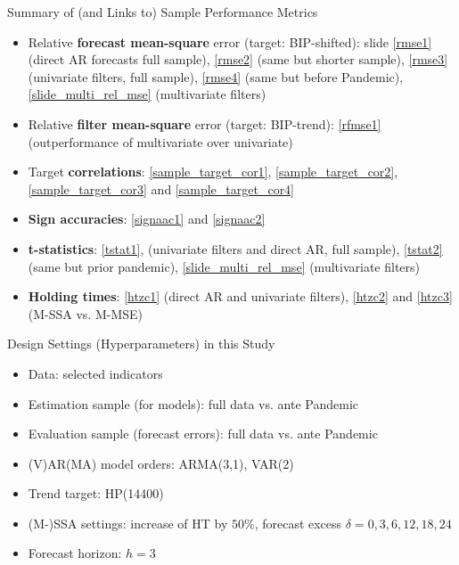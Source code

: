 \documentclass{beamer}
\begin{document}
\begin{frame} {Summary of (and Links to) Sample Performance Metrics}
\begin{itemize}
\item Relative \textbf{forecast mean-square} error (target: BIP-shifted): slide \eqref{rmse1} (direct AR forecasts full sample), \eqref{rmse2} (same but shorter sample), \eqref{rmse3} (univariate filters, full sample), \eqref{rmse4} (same but before Pandemic), \eqref{slide_multi_rel_mse} (multivariate filters) 

\item Relative \textbf{filter mean-square} error (target: BIP-trend): \eqref{rfmse1} (outperformance of multivariate over univariate)

\item Target \textbf{correlations}: \eqref{sample_target_cor1}, \eqref{sample_target_cor2}, \eqref{sample_target_cor3} and \eqref{sample_target_cor4} 

\item \textbf{Sign accuracies}: \eqref{signaac1} and \eqref{signaac2}

\item \textbf{t-statistics}: \eqref{tstat1},  (univariate filters and direct AR, full sample), \eqref{tstat2} (same but prior pandemic), \eqref{slide_multi_rel_mse} (multivariate filters)

\item \textbf{Holding times}: \eqref{htzc1} (direct AR and univariate filters), \eqref{htzc2} and \eqref{htzc3} (M-SSA vs. M-MSE)
\end{itemize}
\end{frame}



\begin{frame} {Design Settings (Hyperparameters) in this Study}
\begin{itemize}
\item Data: selected indicators
\item Estimation sample (for models): full data vs. ante Pandemic
\item Evaluation sample (forecast errors): full data vs. ante Pandemic
\item (V)AR(MA) model orders: ARMA(3,1), VAR(2)
\item Trend target: HP(14400)
\item (M-)SSA settings: increase of HT by $50\%$, forecast excess $\delta=0, 3, 6, 12, 18, 24$
\item Forecast horizon: $h=3$
\end{itemize}
\end{frame}
\end{document}
